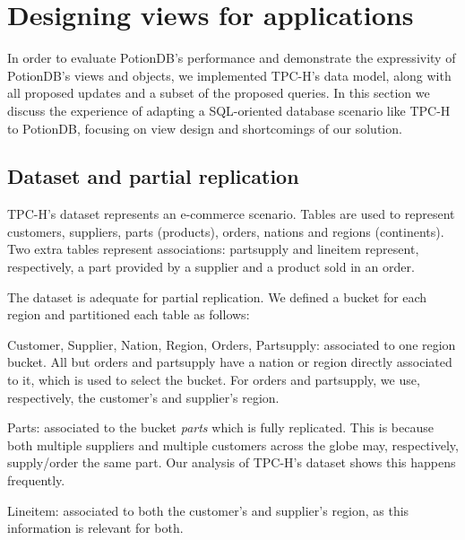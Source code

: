 \documentclass{vldb}
\begin{document}
\section{Designing views for applications}
\label{sec:views_for_apps}

In order to evaluate PotionDB's performance and demonstrate the expressivity of PotionDB's views and objects, we implemented TPC-H's data model, along with all proposed updates and a subset of the proposed queries.
In this section we discuss the experience of adapting a SQL-oriented database scenario like TPC-H to PotionDB, focusing on view design and shortcomings of our solution.

\subsection{Dataset and partial replication}
\label{subsec:dataset}

TPC-H's dataset represents an e-commerce scenario. %
Tables are used to represent customers, suppliers, parts (products), orders, nations and regions (continents).
Two extra tables represent associations: partsupply and lineitem represent, respectively, a part provided by a supplier and a product sold in an order. %

The dataset is adequate for partial replication.
We defined a bucket for each region and partitioned each table as follows:

\begin{compactitem}
	\item Customer, Supplier, Nation, Region, Orders, Partsupply: associated to one region bucket. 
	All but orders and partsupply have a nation or region directly associated to it, which is used to select the bucket.
	For orders and partsupply, we use, respectively, the customer's and supplier's region.
	\item Parts: associated to the bucket \emph{parts} which is fully replicated.
	This is because both multiple suppliers and multiple customers across the globe may, respectively, supply/order the same part.
	Our analysis of TPC-H's dataset shows this happens frequently.
	\item Lineitem: associated to both the customer's and supplier's region, as this information is relevant for both.
\end{compactitem}
\end{document}
